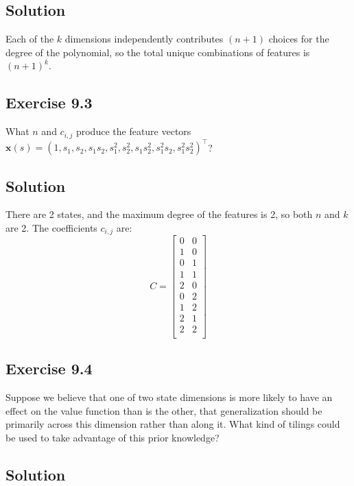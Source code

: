 \subsection*{Solution}

Each of the $k$ dimensions independently contributes $(n+1)$ choices for the degree of the polynomial, so the total unique combinations of features is $(n+1)^k$.

\subsection*{Exercise 9.3}

What $n$ and $c_{i,j}$ produce the feature vectors $\mathbf{x}(s) = (1, s_1, s_2, s_1s_2, s_1^2, s_2^2, s_1s_2^2, s_1^2 s_2, s_1^2 s_2^2)^\top$?

\subsection*{Solution}

There are 2 states, and the maximum degree of the features is 2, so both $n$ and $k$ are 2. The coefficients $c_{i,j}$ are:
\[
C = \begin{bmatrix}
    0 & 0 \\
    1 & 0 \\
    0 & 1 \\
    1 & 1 \\
    2 & 0 \\
    0 & 2 \\
    1 & 2 \\
    2 & 1 \\
    2 & 2 \\
\end{bmatrix}
\]

\subsection*{Exercise 9.4}

Suppose we believe that one of two state dimensions is more likely to have
an effect on the value function than is the other, that generalization should be primarily
across this dimension rather than along it. What kind of tilings could be used to take
advantage of this prior knowledge?

\subsection*{Solution}

